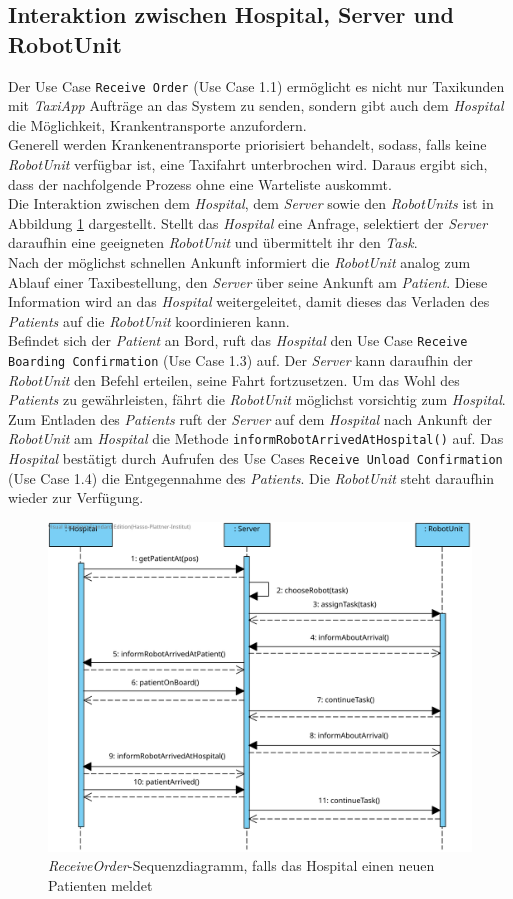 \subsection*{Interaktion zwischen Hospital, Server und RobotUnit}
Der Use Case \texttt{Receive Order} (Use Case 1.1) ermöglicht es nicht nur Taxikunden mit \emph{TaxiApp} Aufträge an das System zu senden, sondern gibt auch dem \emph{Hospital} die Möglichkeit, Krankentransporte anzufordern. \\
Generell werden Krankenentransporte priorisiert behandelt, sodass, falls keine \emph{RobotUnit} verfügbar ist, eine Taxifahrt unterbrochen wird. Daraus ergibt sich, dass der nachfolgende Prozess ohne eine Warteliste auskommt. \\
Die Interaktion zwischen dem \emph{Hospital}, dem \emph{Server} sowie den \emph{RobotUnits} ist in Abbildung \ref{SequenzDiagrammInteraktionHospital} dargestellt.
Stellt das \emph{Hospital} eine Anfrage, selektiert der \emph{Server} daraufhin eine geeigneten \emph{RobotUnit} und übermittelt ihr den \emph{Task}. \\
Nach der möglichst schnellen Ankunft informiert die \emph{RobotUnit} analog zum Ablauf einer Taxibestellung, den \emph{Server} über seine Ankunft am \emph{Patient}. Diese Information wird an das \emph{Hospital} weitergeleitet, damit dieses das Verladen des \emph{Patients} auf die \emph{RobotUnit} koordinieren kann. \\
Befindet sich der \emph{Patient} an Bord, ruft das \emph{Hospital} den Use Case \texttt{Receive Boarding Confirmation} (Use Case 1.3) auf. Der \emph{Server} kann daraufhin der \emph{RobotUnit} den Befehl erteilen, seine Fahrt fortzusetzen. Um das Wohl des \emph{Patients} zu gewährleisten, fährt die \emph{RobotUnit} möglichst vorsichtig zum \emph{Hospital}. \\
Zum Entladen des \emph{Patients} ruft der \emph{Server} auf dem \emph{Hospital} nach Ankunft der \emph{RobotUnit} am \emph{Hospital} die Methode \texttt{informRobotArrivedAtHospital()} auf. Das \emph{Hospital} bestätigt durch Aufrufen des Use Cases \texttt{Receive Unload Confirmation} (Use Case 1.4) die Entgegennahme des \emph{Patients}. Die \emph{RobotUnit} steht daraufhin wieder zur Verfügung.
\begin{figure}[H]
	\centering
	\includegraphics[width=1\textwidth]{img/2-Entwurf-ReceiveOrder-Hosp}
	\caption{\emph{ReceiveOrder}-Sequenzdiagramm, falls das Hospital einen neuen Patienten meldet}
	\label{SequenzDiagrammInteraktionHospital}
\end{figure}


